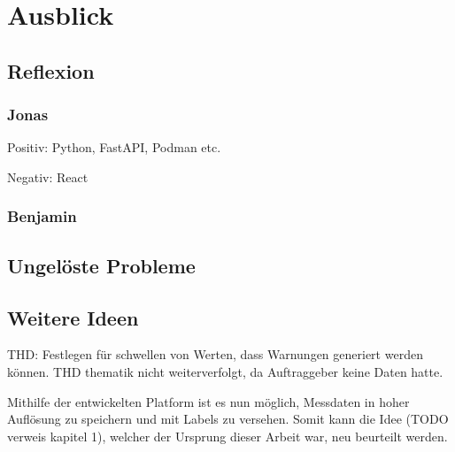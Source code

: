 \chapter{Ausblick}

\section{Reflexion}
\subsection{Jonas}
Positiv: Python, FastAPI, Podman etc.

Negativ:
React

\subsection{Benjamin}
\section{Ungelöste Probleme}



\section{Weitere Ideen}
THD: Festlegen für schwellen von Werten, dass Warnungen generiert werden können.
THD thematik nicht weiterverfolgt, da Auftraggeber keine Daten hatte.

Mithilfe der entwickelten Platform ist es nun möglich, Messdaten in hoher Auflösung zu speichern
und mit Labels zu versehen. Somit kann die Idee (TODO verweis kapitel 1), welcher der Ursprung dieser
Arbeit war, neu beurteilt werden. 


